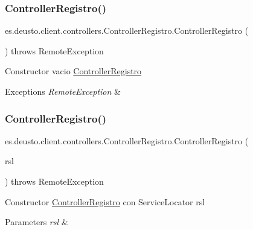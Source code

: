 \subsubsection{\texorpdfstring{ControllerRegistro()}{ControllerRegistro()}\hspace{0.1cm}{\footnotesize\ttfamily [2/3]}}
{\footnotesize\ttfamily es.\+deusto.\+client.\+controllers.\+Controller\+Registro.\+Controller\+Registro (\begin{DoxyParamCaption}{ }\end{DoxyParamCaption}) throws Remote\+Exception}

Constructor vacio \mbox{\hyperlink{classes_1_1deusto_1_1client_1_1controllers_1_1_controller_registro}{Controller\+Registro}} 
\begin{DoxyExceptions}{Exceptions}
{\em Remote\+Exception} & \\
\hline
\end{DoxyExceptions}
\mbox{\label{classes_1_1deusto_1_1client_1_1controllers_1_1_controller_registro_ad5f876dd482f9c5e1c17b86a6766def2}} 
\subsubsection{\texorpdfstring{ControllerRegistro()}{ControllerRegistro()}\hspace{0.1cm}{\footnotesize\ttfamily [3/3]}}
{\footnotesize\ttfamily es.\+deusto.\+client.\+controllers.\+Controller\+Registro.\+Controller\+Registro (\begin{DoxyParamCaption}\item[{\mbox{\hyperlink{classes_1_1deusto_1_1client_1_1remote_1_1_service_locator}{Service\+Locator}}}]{rsl }\end{DoxyParamCaption}) throws Remote\+Exception}

Constructor \mbox{\hyperlink{classes_1_1deusto_1_1client_1_1controllers_1_1_controller_registro}{Controller\+Registro}} con Service\+Locator rsl 
\begin{DoxyParams}{Parameters}
{\em rsl} & \\
\hline
\end{DoxyParams}

